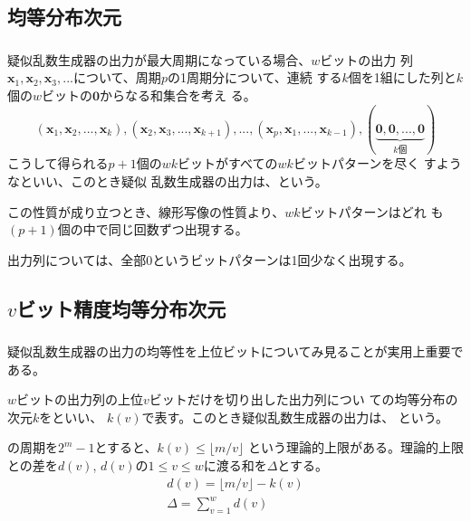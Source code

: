 \documentclass[cjk, dvips, handout, trans, xcolor=dvipsnames]{beamer}
\def\bx{{{\mathbf x}}}
\begin{document}
\subsection{均等分布次元}
\begin{frame}[t]
  \frametitle{\insertsubsection}

  疑似乱数生成器の出力が最大周期になっている場合、$w$ビットの出力
  列$\bx_1, \bx_2, \bx_3, ...$について、周期$p$の1周期分について、連続
  する$k$個を1組にした列と$k$個の$w$ビットの$\mathbf{0}$からなる和集合を考え
  る。
  \[
  (\bx_1, \bx_2, ..., \bx_k), (\bx_2, \bx_3, ..., \bx_{k+1}), ...,
  (\bx_{p}, \bx_{1}, ..., \bx_{k-1}), (\underbrace{\mathbf{0},
    \mathbf{0}, ..., \mathbf{0}}_{k\text{個}})
  \]
  \pause
  こうして得られる$p+1$個の$wk$ビットがすべての$wk$ビットパターンを尽く
  すようなといい、このとき疑似
  乱数生成器の出力は、という。


  \pause
  \vspace{\baselineskip}
  この性質が成り立つとき、線形写像の性質より、$wk$ビットパターンはどれ
  も$(p+1)$個の中で同じ回数ずつ出現する。

  出力列については、全部$0$というビットパターンは1回少なく出現する。
\end{frame}

\subsection{$v$ビット精度均等分布次元}
\begin{frame}[t]
  \frametitle{\insertsubsection}

  疑似乱数生成器の出力の均等性を上位ビットについてみ見ることが実用上重要である。


  \pause
  \vspace{\baselineskip}
  $w$ビットの出力列の上位$v$ビットだけを切り出した出力列につい
  ての均等分布の次元$k$をといい、
  $k(v)$で表す。このとき疑似乱数生成器の出力は、
  という。

  \pause
  \vspace{\baselineskip}
  \FLPRNG の周期を$2^m-1$とすると、$k(v) \le \lfloor m/v \rfloor$
  という理論的上限がある。理論的上限との差を$d(v)$,
  $d(v)$の$1 \le v \le w$に渡る和を$\Delta$とする。
  \begin{gather*}
    d(v) = \lfloor m/v \rfloor - k(v)\\
    \Delta = \sum_{v = 1}^w d(v)
  \end{gather*}
\end{frame}
\end{document}
